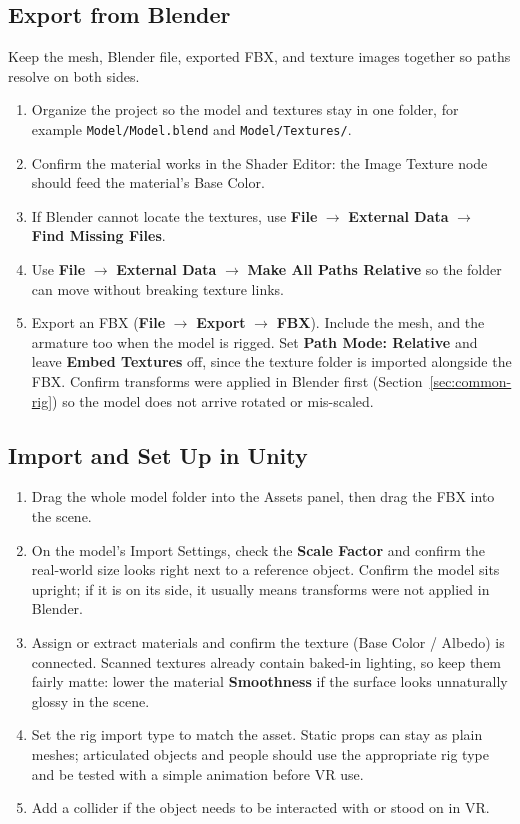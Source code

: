 \documentclass[11pt]{article}
\begin{document}
\subsection{Export from Blender}
Keep the mesh, Blender file, exported FBX, and texture images together so paths resolve on both sides.
\begin{enumerate}[leftmargin=1.6em]
  \item Organize the project so the model and textures stay in one folder, for example \texttt{Model/Model.blend} and \texttt{Model/Textures/}.
  \item Confirm the material works in the Shader Editor: the Image Texture node should feed the material's Base Color.
  \item If Blender cannot locate the textures, use \textbf{File} $\rightarrow$ \textbf{External Data} $\rightarrow$ \textbf{Find Missing Files}.
  \item Use \textbf{File} $\rightarrow$ \textbf{External Data} $\rightarrow$ \textbf{Make All Paths Relative} so the folder can move without breaking texture links.
  \item Export an FBX (\textbf{File} $\rightarrow$ \textbf{Export} $\rightarrow$ \textbf{FBX}). Include the mesh, and the armature too when the model is rigged. Set \textbf{Path Mode: Relative} and leave \textbf{Embed Textures} off, since the texture folder is imported alongside the FBX. Confirm transforms were applied in Blender first (Section~\ref{sec:common-rig}) so the model does not arrive rotated or mis-scaled.
\end{enumerate}

\subsection{Import and Set Up in Unity}
\begin{enumerate}[leftmargin=1.6em]
  \item Drag the whole model folder into the Assets panel, then drag the FBX into the scene.
  \item On the model's Import Settings, check the \textbf{Scale Factor} and confirm the real-world size looks right next to a reference object. Confirm the model sits upright; if it is on its side, it usually means transforms were not applied in Blender.
  \item Assign or extract materials and confirm the texture (Base Color / Albedo) is connected. Scanned textures already contain baked-in lighting, so keep them fairly matte: lower the material \textbf{Smoothness} if the surface looks unnaturally glossy in the scene.
  \item Set the rig import type to match the asset. Static props can stay as plain meshes; articulated objects and people should use the appropriate rig type and be tested with a simple animation before VR use.
  \item Add a collider if the object needs to be interacted with or stood on in VR.
\end{enumerate}
\end{document}
